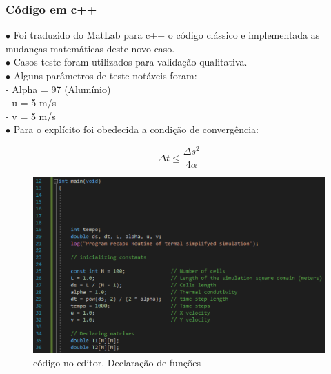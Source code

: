 \documentclass[xcolor=dvipsnames,10pt,aspectratio=169]{beamer}
\begin{document}
	
	\begin{frame} 
	\frametitle{Código em c++}
	\begin{minipage}[h!]{0.49\textwidth}
	$\bullet$ Foi traduzido do MatLab para c++ o código clássico e implementada as mudanças matemáticas deste novo caso.\\
	$\bullet$ Casos teste foram utilizados para validação qualitativa.\\
	$\bullet$ Alguns parâmetros de teste notáveis foram: \\
	
	- Alpha = 97 (Alumínio) \\
	- u = 5 m/s \\
	- v = 5 m/s \\
	
	$\bullet$ Para o explícito foi obedecida a condição de convergência:
	
	\begin{equation}
	\Delta t \leq \frac{\Delta s ^2}{4 \alpha} 
	\end{equation}
		
	\end{minipage}
	\begin{minipage}[h!]{0.49\textwidth}
		\begin{figure}[h!]
		\centering
		\includegraphics[trim = {0cm 1cm 5cm 1cm}, clip , angle=0, scale=0.65]{printCodigo1}
		\caption{código no editor. Declaração de funções}
	\end{figure}
	\end{minipage}
	\end{frame}
	
	
	
	
	
\end{document}
